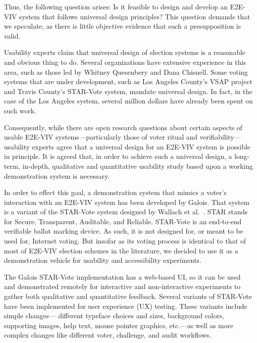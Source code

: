 Thus, the following question arises: Is it feasible to design and
develop an E2E-VIV system that follows universal design principles?
This question demands that we speculate, as there is little objective
evidence that such a presupposition is valid.

Usability experts claim that universal design of election systems is a
reasonable and obvious thing to do. Several organizations have
extensive experience in this area, such as those led by Whitney
Quesenbery and Dana Chisnell. Some voting systems that are under
development, such as Los Angeles County's VSAP project and Travis
County's STAR-Vote system, mandate universal design. In fact, in the
case of the Los Angeles system, several million dollars have already
been spent on such work.

Consequently, while there are open research questions about certain
aspects of usable E2E-VIV systems---particularly those of voter ritual
and verifiability---usability experts agree that a universal design
for an E2E-VIV system is possible in principle. It is agreed that, in
order to achieve such a universal design, a long-term, in-depth,
qualitative and quantitative usability study based upon a working
demonstration system is necessary.


In order to effect this goal, a demonstration system that mimics a
voter's interaction with an E2E-VIV system has been developed by
Galois. That system is a variant of the STAR-Vote system designed by
Wallach et al.~\cite{star-vote}. STAR stands for Secure, Transparent,
Auditable, and Reliable. STAR-Vote is an end-to-end verifiable ballot
marking device. As such, it is not designed for, or meant to be used
for, Internet voting. But insofar as its voting process is identical
to that of most of E2E-VIV election schemes in the literature, we
decided to use it as a demonstration vehicle for usability and
accessibility experiments.

The Galois STAR-Vote implementation has a web-based UI, so it can be
used and demonstrated remotely for interactive and non-interactive
experiments to gather both qualitative and quantitative feedback.
Several variants of STAR-Vote have been implemented for user
experience (UX) testing.  These variants include simple changes---
different typeface choices and sizes, background colors, supporting
images, help text, mouse pointer graphics, etc.---as well as more
complex changes like different voter, challenge, and audit workflows.

